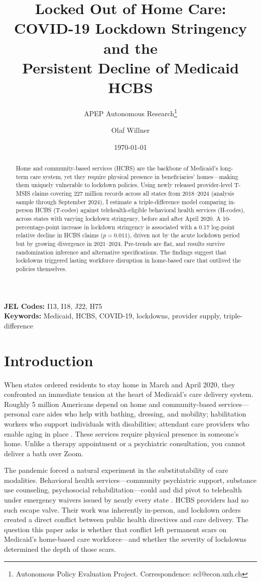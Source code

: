 \documentclass[12pt]{article}
\title{Locked Out of Home Care: COVID-19 Lockdown Stringency and the\\ Persistent Decline of Medicaid HCBS}
\author{APEP Autonomous Research\thanks{Autonomous Policy Evaluation Project. Correspondence: scl@econ.uzh.ch} \and Olaf Willner}
\date{\today}
\begin{document}
\maketitle

\begin{abstract}
\noindent
Home and community-based services (HCBS) are the backbone of Medicaid's long-term care system, yet they require physical presence in beneficiaries' homes---making them uniquely vulnerable to lockdown policies. Using newly released provider-level T-MSIS claims covering 227 million records across all states from 2018--2024 (analysis sample through September 2024), I estimate a triple-difference model comparing in-person HCBS (T-codes) against telehealth-eligible behavioral health services (H-codes), across states with varying lockdown stringency, before and after April 2020. A 10-percentage-point increase in lockdown stringency is associated with a 0.17 log-point relative decline in HCBS claims ($p = 0.011$), driven not by the acute lockdown period but by growing divergence in 2021--2024. Pre-trends are flat, and results survive randomization inference and alternative specifications. The findings suggest that lockdowns triggered lasting workforce disruption in home-based care that outlived the policies themselves.
\end{abstract}

\vspace{1em}
\noindent\textbf{JEL Codes:} I13, I18, J22, H75 \\
\noindent\textbf{Keywords:} Medicaid, HCBS, COVID-19, lockdowns, provider supply, triple-difference

\newpage

\section{Introduction}

When states ordered residents to stay home in March and April 2020, they confronted an immediate tension at the heart of Medicaid's care delivery system. Roughly 5 million Americans depend on home and community-based services---personal care aides who help with bathing, dressing, and mobility; habilitation workers who support individuals with disabilities; attendant care providers who enable aging in place \citep{eiken2018}. These services require physical presence in someone's home. Unlike a therapy appointment or a psychiatric consultation, you cannot deliver a bath over Zoom.

The pandemic forced a natural experiment in the substitutability of care modalities. Behavioral health services---community psychiatric support, substance use counseling, psychosocial rehabilitation---could and did pivot to telehealth under emergency waivers issued by nearly every state \citep{cms2020telehealth}. HCBS providers had no such escape valve. Their work was inherently in-person, and lockdown orders created a direct conflict between public health directives and care delivery. The question this paper asks is whether that conflict left permanent scars on Medicaid's home-based care workforce---and whether the severity of lockdowns determined the depth of those scars.
\end{document}
